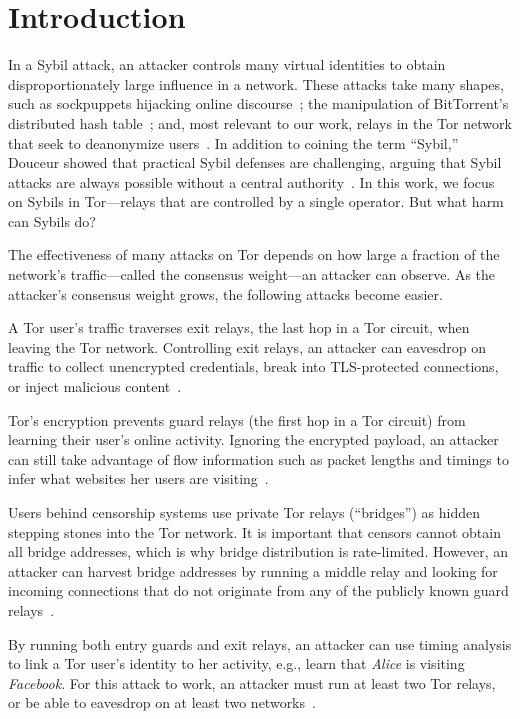 \section{Introduction}
\label{sec:introduction}
In a Sybil attack, an attacker controls many virtual identities to obtain
disproportionately large influence in a network.  These attacks take many
shapes, such as sockpuppets hijacking online discourse~\cite{Thomas2012a}; the
manipulation of BitTorrent's distributed hash table~\cite{Wang2012a}; and, most
relevant to our work, relays in the Tor network that seek to deanonymize
users~\cite{cmucert}.  In addition to coining the term ``Sybil,'' Douceur showed
that practical Sybil defenses are challenging, arguing that Sybil attacks are
always possible without a central authority~\cite{Douceur2002a}.  In this work,
we focus on Sybils in Tor---relays that are controlled by a single operator.
But what harm can Sybils do?

The effectiveness of many attacks on Tor depends on how large a fraction of the
network's traffic---called the consensus weight---an attacker can observe.  As
the attacker's consensus weight grows, the following attacks become easier.

\begin{description}[noitemsep]
	\item[Exit traffic tampering:] A Tor user's traffic traverses exit relays,
		the last hop in a Tor circuit, when leaving the Tor network.
		Controlling exit relays, an attacker can eavesdrop on traffic to
		collect unencrypted credentials, break into TLS-protected connections,
		or inject malicious content~\cite[\S~5.2]{Winter2014a}.
	\item[Website fingerprinting:] Tor's encryption prevents guard relays (the
		first hop in a Tor circuit) from learning their user's online activity.
		Ignoring the encrypted payload, an attacker can still take advantage of
		flow information such as packet lengths and timings to infer what
		websites her users are visiting~\cite{Juarez2014a}.
	\item[Bridge address harvesting:] Users behind censorship systems use
		private Tor relays (``bridges'') as hidden stepping stones into the Tor
		network.  It is important that censors cannot obtain all bridge
		addresses, which is why bridge distribution is rate-limited.  However,
		an attacker can harvest bridge addresses by running a middle relay and
		looking for incoming connections that do not originate from any of the
		publicly known guard relays~\cite[\S~3.4]{Ling2015b}.
	\item[End-to-end correlation:] By running both entry guards and exit relays,
		an attacker can use timing analysis to link a Tor user's identity to her
		activity, e.g., learn that \emph{Alice} is visiting \emph{Facebook}.
		For this attack to work, an attacker must run at least two Tor relays,
		or be able to eavesdrop on at least two networks~\cite{Johnson2013a}.
\end{description}

